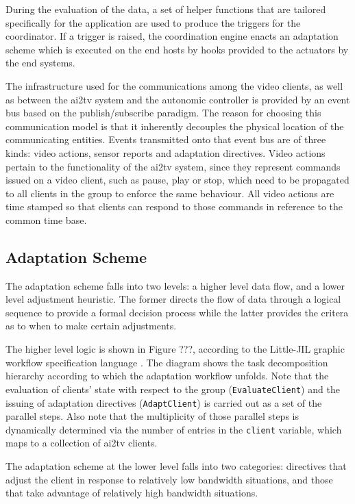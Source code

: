 \documentclass{sig-alternate}
\begin{document}
During the evaluation of the data, a set of helper functions that are
tailored specifically for the application are used to produce the
triggers for the coordinator.  If a trigger is raised, the
coordination engine enacts an adaptation scheme which is executed on
the end hosts by hooks provided to the actuators by the end systems.

The infrastructure used for the communications among the video
clients, as well as between the ai2tv system and the autonomic
controller is provided by an event bus based on the publish/subscribe
paradigm.  The reason for choosing this communication model is that it
inherently decouples the physical location of the communicating
entities.  Events transmitted onto that event bus are of three kinds:
video actions, sensor reports and adaptation directives.  Video
actions pertain to the functionality of the ai2tv system, since they
represent commands issued on a video client, such as pause, play or
stop, which need to be propagated to all clients in the group to
enforce the same behaviour.  All video actions are time stamped so
that clients can respond to those commands in reference to the common
time base.

\subsection{Adaptation Scheme}

The adaptation scheme falls into two levels: a higher level data flow,
and a lower level adjustment heuristic.  The former directs the flow
of data through a logical sequence to provide a formal decision
process while the latter provides the critera as to when to make
certain adjustments.

The higher level logic is shown in Figure ???, according to the
Little-JIL graphic workflow specification language \cite{L-JIL}.  The
diagram shows the task decomposition hierarchy according to which the
adaptation workflow unfolds.  Note that the evaluation of clients'
state with respect to the group (\texttt{EvaluateClient}) and the
issuing of adaptation directives (\texttt{AdaptClient}) is carried out
as a set of the parallel steps.  Also note that the multiplicity of
those parallel steps is dynamically determined via the number of
entries in the \texttt{client} variable, which maps to a collection of
ai2tv clients.

%
%

The adaptation scheme at the lower level falls into two categories:
directives that adjust the client in response to relatively low
bandwidth situations, and those that take advantage of relatively high
bandwidth situations.
\end{document}
